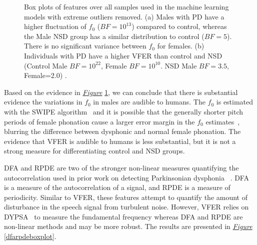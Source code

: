 \documentclass[12pt, twoside]{book}
\begin{document}
\begin{figure}[!htbp]
{\begin{subfigure}[]{0.58\textwidth}
	\end{subfigure}
   	}
	\caption{Box plots of features over all samples used in the machine learning models with extreme outliers removed. (a) Males with PD have a higher fluctuation of $f_0$ ($BF=10^{13}$) compared to control, whereas the Male NSD group has a similar distribution to control ($BF=5$). There is no significant variance between $f_0$ for females. (b) Individuals with PD have a higher VFER than control and NSD (Control Male $BF=10^{22}$, Female $BF=10^{10}$. NSD Male $BF=3.5$, Female=$2.0$) .}
	\label{f0vferboxplot}
\end{figure}

Based on the evidence in \textit{\hyperref[f0vferboxplot]{Figure}} \ref{f0vferboxplot}, we can conclude that there is substantial evidence the variations in $f_0$ in males are audible to humans. The $f_0$ is estimated with the SWIPE algorithm~\cite{camacho2007swipe} and it is possible that the generally shorter pitch periods of female phonation cause a larger error margin in the $f_0$ estimates~\cite{f0estimation}, blurring the difference between dysphonic and normal female phonation. The evidence that VFER is audible to humans is less substantial, but it is not a strong measure for differentiating control and NSD groups.

DFA and RPDE are two of the stronger non-linear measures quantifying the autocorrelation used in prior work on detecting Parkinsonian dysphonia ~\cite{splittledysphonia2009}. DFA is a measure of the autocorrelation of a signal, and RPDE is a measure of periodicity. Similar to VFER, these features attempt to quantify the amount of disturbance in the speech signal from turbulent noise. However, VFER relies on DYPSA~\cite{dypsa} to measure the fundamental frequency whereas DFA and RPDE are non-linear methods and may be more robust. The results are presented in \textit{\hyperref[dfarpdeboxplot]{Figure}} \ref{dfarpdeboxplot}. 

\end{document}
